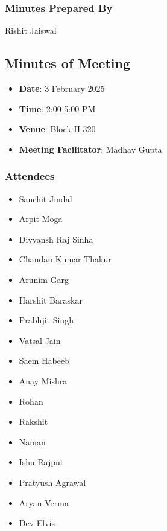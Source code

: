 \documentclass[12pt,a4paper]{article}
\begin{document}
\subsubsection*{Minutes Prepared By}
Rishit Jaiswal

\subsection*{Minutes of Meeting}
\begin{itemize}
    \item \textbf{Date}: 3 February 2025
    \item \textbf{Time}: 2:00-5:00 PM
    \item \textbf{Venue}: Block II 320
    \item \textbf{Meeting Facilitator}: Madhav Gupta
\end{itemize}

\subsubsection*{Attendees}
\begin{itemize}
    \item Sanchit Jindal
    \item Arpit Moga
    \item Divyansh Raj Sinha
    \item Chandan Kumar Thakur
    \item Arunim Garg
    \item Harshit Baraskar
    \item Prabhjit Singh
    \item Vatsal Jain
    \item Saem Habeeb
    \item Anay Mishra
    \item Rohan
    \item Rakshit
    \item Naman 
    \item Ishu Rajput
    \item Pratyush Agrawal
    \item Aryan Verma
    \item Dev Elvis
\end{itemize}
\end{document}
